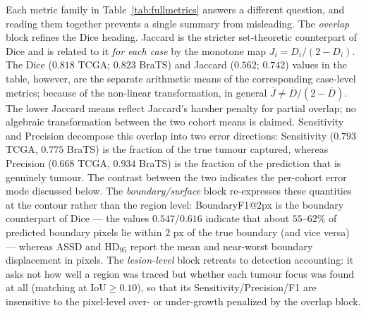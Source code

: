 \documentclass[11pt,a4paper]{article}
\begin{document}
\begin{table}[h]\centering
\caption{Final performance, reported in the roles of TCGA-LGG development,
UCSF-PDGM grade 2--3 independent external validation and BraTS~2023 cross-grade stress test. Because UCSF and BraTS are skull-stripped, the ROI gate does not open and the result is identical to the core pipeline.}
\label{tab:results}
\end{table}

Each metric family in Table~\ref{tab:fullmetrics} answers a different question,
and reading them together prevents a single summary from misleading. The
\emph{overlap} block refines the Dice heading. Jaccard is the stricter
set-theoretic counterpart of Dice and is related to it \emph{for each case} by the
monotone map $J_i=D_i/(2-D_i)$. The Dice ($0.818$ TCGA; $0.823$ BraTS) and Jaccard
($0.562$; $0.742$) values in the table, however, are the separate arithmetic means
of the corresponding case-level metrics; because of the non-linear transformation,
in general $\overline{J}\neq\overline{D}/(2-\overline{D})$. The lower Jaccard means
reflect Jaccard's harsher penalty for partial overlap; no algebraic transformation
between the two cohort means is claimed. Sensitivity and Precision decompose this
overlap into two error directions: Sensitivity ($0.793$ TCGA, $0.775$ BraTS) is
the fraction of the true tumour captured, whereas Precision ($0.668$ TCGA, $0.934$
BraTS) is the fraction of the prediction that is genuinely tumour. The contrast
between the two indicates the per-cohort error mode discussed below. The
\emph{boundary/surface} block re-expresses these quantities at the contour rather
than the region level: BoundaryF1@2px is the boundary counterpart of Dice --- the
values $0.547$/$0.616$ indicate that about $55$--$62\%$ of predicted boundary
pixels lie within $2$ px of the true boundary (and vice versa) --- whereas ASSD and
HD$_{95}$ report the mean and near-worst boundary displacement in pixels. The
\emph{lesion-level} block retreats to detection accounting: it asks not how well a
region was traced but whether each tumour focus was found at all (matching at
IoU$\ge 0.10$), so that its Sensitivity/Precision/F1 are insensitive to the
pixel-level over- or under-growth penalized by the overlap block.
\end{document}
